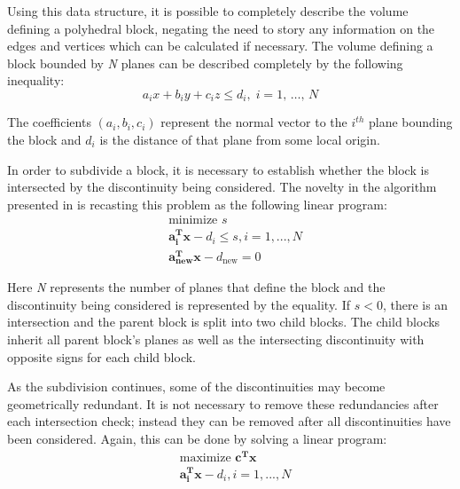 Using this data structure, it is possible to completely describe the volume defining a polyhedral block, negating the need to story any information on the edges and vertices which can be calculated if necessary. The volume defining a block bounded by \textit{N} planes can be described completely by the following inequality:
\begin{equation}
a_ix + b_iy + c_iz \leq d_i, \; i = 1 ,\, \ldots ,\, N
\end{equation}

The coefficients $(a_i, b_i, c_i)$ represent the normal vector to the $i^{th}$ plane bounding the block and $d_i$ is the distance of that plane from some local origin. \par
 
In order to subdivide a block, it is necessary to establish whether the block is intersected by the discontinuity being considered. The novelty in the algorithm presented in \cite{slicing} is recasting this problem as the following linear program: 
\begin{equation}
\begin{aligned} 
&\text{minimize } s\\
&\boldsymbol{a_{i}^{T} x} - d_i \leq s, i = 1,...,N\\
&\boldsymbol{a_{\text{new}}^{T} x} - d_{\text{new}} = 0
\end{aligned}
\end{equation}

Here \textit{N} represents the number of planes that define the block and the discontinuity being considered is represented by the equality. If $s < 0$, there is an intersection and the parent block is split into two child blocks. The child blocks inherit all parent block's planes as well as the intersecting discontinuity with opposite signs for each child block. \par

As the subdivision continues, some of the discontinuities may become geometrically redundant. It is not necessary to remove these redundancies after each intersection check; instead they can be removed after all discontinuities have been considered. Again, this can be done by solving a linear program: 
\begin{equation}
\begin{aligned}
&\text{maximize }\boldsymbol{c^{T} x}\\
&\boldsymbol{a_{i}^{T} x} - d_{i}, i = 1,...,N
\end{aligned}
\end{equation}

